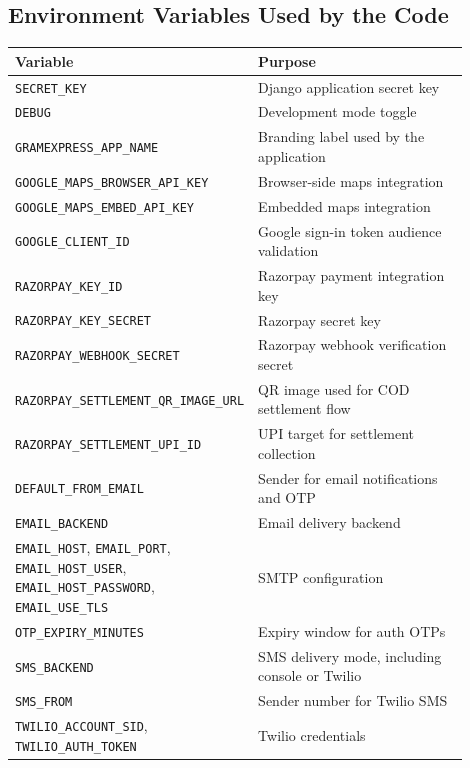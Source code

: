 \documentclass[12pt,a4paper]{article}
\begin{document}
\subsection{Environment Variables Used by the Code}
\begin{longtable}{|p{0.36\linewidth}|p{0.54\linewidth}|}
\hline
\textbf{Variable} & \textbf{Purpose} \\
\hline
\texttt{SECRET\_KEY} & Django application secret key \\
\hline
\texttt{DEBUG} & Development mode toggle \\
\hline
\texttt{GRAMEXPRESS\_APP\_NAME} & Branding label used by the application \\
\hline
\texttt{GOOGLE\_MAPS\_BROWSER\_API\_KEY} & Browser-side maps integration \\
\hline
\texttt{GOOGLE\_MAPS\_EMBED\_API\_KEY} & Embedded maps integration \\
\hline
\texttt{GOOGLE\_CLIENT\_ID} & Google sign-in token audience validation \\
\hline
\texttt{RAZORPAY\_KEY\_ID} & Razorpay payment integration key \\
\hline
\texttt{RAZORPAY\_KEY\_SECRET} & Razorpay secret key \\
\hline
\texttt{RAZORPAY\_WEBHOOK\_SECRET} & Razorpay webhook verification secret \\
\hline
\texttt{RAZORPAY\_SETTLEMENT\_QR\_IMAGE\_URL} & QR image used for COD settlement flow \\
\hline
\texttt{RAZORPAY\_SETTLEMENT\_UPI\_ID} & UPI target for settlement collection \\
\hline
\texttt{DEFAULT\_FROM\_EMAIL} & Sender for email notifications and OTP \\
\hline
\texttt{EMAIL\_BACKEND} & Email delivery backend \\
\hline
\texttt{EMAIL\_HOST}, \texttt{EMAIL\_PORT}, \texttt{EMAIL\_HOST\_USER}, \texttt{EMAIL\_HOST\_PASSWORD}, \texttt{EMAIL\_USE\_TLS} & SMTP configuration \\
\hline
\texttt{OTP\_EXPIRY\_MINUTES} & Expiry window for auth OTPs \\
\hline
\texttt{SMS\_BACKEND} & SMS delivery mode, including console or Twilio \\
\hline
\texttt{SMS\_FROM} & Sender number for Twilio SMS \\
\hline
\texttt{TWILIO\_ACCOUNT\_SID}, \texttt{TWILIO\_AUTH\_TOKEN} & Twilio credentials \\
\hline
\end{longtable}
\end{document}
